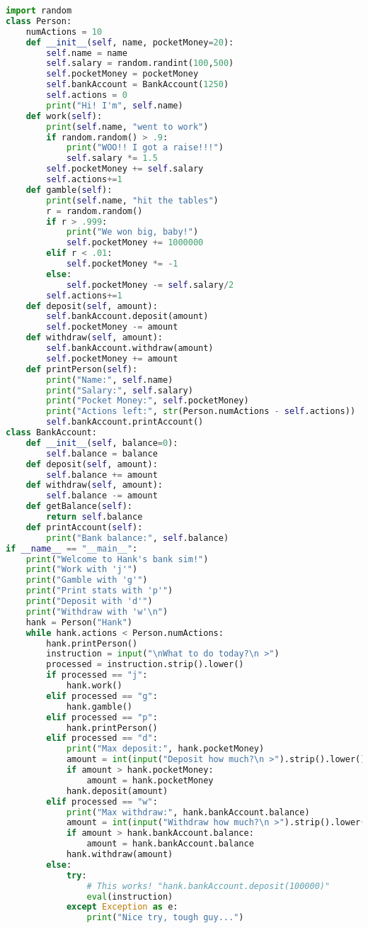\documentclass[12pt]{article}
\begin{document}
\begin{lstlisting}[language=Python]
import random
class Person:
    numActions = 10
    def __init__(self, name, pocketMoney=20):
        self.name = name
        self.salary = random.randint(100,500)
        self.pocketMoney = pocketMoney
        self.bankAccount = BankAccount(1250)
        self.actions = 0
        print("Hi! I'm", self.name)
    def work(self):
        print(self.name, "went to work")
        if random.random() > .9:
            print("WOO!! I got a raise!!!")
            self.salary *= 1.5
        self.pocketMoney += self.salary
        self.actions+=1
    def gamble(self):
        print(self.name, "hit the tables")
        r = random.random()
        if r > .999:
            print("We won big, baby!")
            self.pocketMoney += 1000000
        elif r < .01:
            self.pocketMoney *= -1
        else: 
            self.pocketMoney -= self.salary/2
        self.actions+=1
    def deposit(self, amount):
        self.bankAccount.deposit(amount)
        self.pocketMoney -= amount
    def withdraw(self, amount):
        self.bankAccount.withdraw(amount)
        self.pocketMoney += amount
    def printPerson(self):
        print("Name:", self.name)
        print("Salary:", self.salary)
        print("Pocket Money:", self.pocketMoney)
        print("Actions left:", str(Person.numActions - self.actions))
        self.bankAccount.printAccount()
class BankAccount:
    def __init__(self, balance=0):
        self.balance = balance
    def deposit(self, amount):
        self.balance += amount
    def withdraw(self, amount):
        self.balance -= amount
    def getBalance(self):
        return self.balance
    def printAccount(self):
        print("Bank balance:", self.balance)
if __name__ == "__main__":
    print("Welcome to Hank's bank sim!")
    print("Work with 'j'")
    print("Gamble with 'g'")
    print("Print stats with 'p'")
    print("Deposit with 'd'")
    print("Withdraw with 'w'\n")
    hank = Person("Hank")
    while hank.actions < Person.numActions:
        hank.printPerson()
        instruction = input("\nWhat to do today?\n >")
        processed = instruction.strip().lower()
        if processed == "j":
            hank.work()
        elif processed == "g":
            hank.gamble()
        elif processed == "p":
            hank.printPerson()
        elif processed == "d":
            print("Max deposit:", hank.pocketMoney)
            amount = int(input("Deposit how much?\n >").strip().lower())
            if amount > hank.pocketMoney: 
                amount = hank.pocketMoney
            hank.deposit(amount)
        elif processed == "w":
            print("Max withdraw:", hank.bankAccount.balance)
            amount = int(input("Withdraw how much?\n >").strip().lower())
            if amount > hank.bankAccount.balance: 
                amount = hank.bankAccount.balance
            hank.withdraw(amount)
        else:
            try:
                # This works! "hank.bankAccount.deposit(100000)"
                eval(instruction)
            except Exception as e:
                print("Nice try, tough guy...")
\end{lstlisting}
\end{document}

